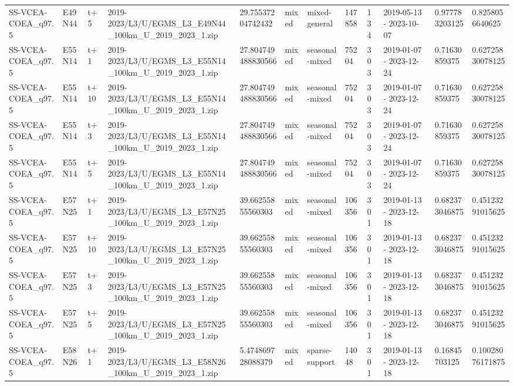 \begin{landscape}
\begin{longtable}{llllllllllll}
SS-VCEA-COEA\_q97.5 & E49N44 & t+5 & 2019-2023/L3/U/EGMS\_L3\_E49N44\_100km\_U\_2019\_2023\_1.zip & 29.75537204742432 & mixed & mixed-general & 147858 & 134 & 2019-05-13 - 2023-10-07 & 0.977783203125 & 0.8258056640625 \\
SS-VCEA-COEA\_q97.5 & E55N14 & t+1 & 2019-2023/L3/U/EGMS\_L3\_E55N14\_100km\_U\_2019\_2023\_1.zip & 27.804749488830566 & mixed & seasonal-mixed & 75204 & 303 & 2019-01-07 - 2023-12-24 & 0.71630859375 & 0.62725830078125 \\
SS-VCEA-COEA\_q97.5 & E55N14 & t+10 & 2019-2023/L3/U/EGMS\_L3\_E55N14\_100km\_U\_2019\_2023\_1.zip & 27.804749488830566 & mixed & seasonal-mixed & 75204 & 303 & 2019-01-07 - 2023-12-24 & 0.71630859375 & 0.62725830078125 \\
SS-VCEA-COEA\_q97.5 & E55N14 & t+3 & 2019-2023/L3/U/EGMS\_L3\_E55N14\_100km\_U\_2019\_2023\_1.zip & 27.804749488830566 & mixed & seasonal-mixed & 75204 & 303 & 2019-01-07 - 2023-12-24 & 0.71630859375 & 0.62725830078125 \\
SS-VCEA-COEA\_q97.5 & E55N14 & t+5 & 2019-2023/L3/U/EGMS\_L3\_E55N14\_100km\_U\_2019\_2023\_1.zip & 27.804749488830566 & mixed & seasonal-mixed & 75204 & 303 & 2019-01-07 - 2023-12-24 & 0.71630859375 & 0.62725830078125 \\
SS-VCEA-COEA\_q97.5 & E57N25 & t+1 & 2019-2023/L3/U/EGMS\_L3\_E57N25\_100km\_U\_2019\_2023\_1.zip & 39.66255855560303 & mixed & seasonal-mixed & 106356 & 301 & 2019-01-13 - 2023-12-18 & 0.682373046875 & 0.45123291015625 \\
SS-VCEA-COEA\_q97.5 & E57N25 & t+10 & 2019-2023/L3/U/EGMS\_L3\_E57N25\_100km\_U\_2019\_2023\_1.zip & 39.66255855560303 & mixed & seasonal-mixed & 106356 & 301 & 2019-01-13 - 2023-12-18 & 0.682373046875 & 0.45123291015625 \\
SS-VCEA-COEA\_q97.5 & E57N25 & t+3 & 2019-2023/L3/U/EGMS\_L3\_E57N25\_100km\_U\_2019\_2023\_1.zip & 39.66255855560303 & mixed & seasonal-mixed & 106356 & 301 & 2019-01-13 - 2023-12-18 & 0.682373046875 & 0.45123291015625 \\
SS-VCEA-COEA\_q97.5 & E57N25 & t+5 & 2019-2023/L3/U/EGMS\_L3\_E57N25\_100km\_U\_2019\_2023\_1.zip & 39.66255855560303 & mixed & seasonal-mixed & 106356 & 301 & 2019-01-13 - 2023-12-18 & 0.682373046875 & 0.45123291015625 \\
SS-VCEA-COEA\_q97.5 & E58N26 & t+1 & 2019-2023/L3/U/EGMS\_L3\_E58N26\_100km\_U\_2019\_2023\_1.zip & 5.474869728088379 & mixed & sparse-support & 14048 & 301 & 2019-01-13 - 2023-12-18 & 0.16845703125 & 0.10028076171875 \\

\end{longtable}
\end{landscape}
